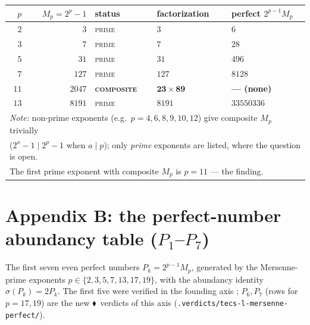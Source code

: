 \documentclass[11pt,a4paper]{article}
\newcommand{\tierF}{\textcolor{blue!60!black}{$\blacklozenge$}}   %
\newcommand{\sig}{\sigma}
\newcommand{\Mp}{M_p}
\theoremstyle{definition}
\begin{document}
\begin{center}
\begin{longtable}{rrlll}
\toprule
$p$ & $\Mp = 2^p-1$ & status & factorization & perfect $2^{p-1}\Mp$ \\
\midrule
\endhead
$2$  & $3$    & \textsc{prime} & $3$           & $6$ \\
$3$  & $7$    & \textsc{prime} & $7$           & $28$ \\
$5$  & $31$   & \textsc{prime} & $31$          & $496$ \\
$7$  & $127$  & \textsc{prime} & $127$         & $8128$ \\
$11$ & $2047$ & \textbf{\textsc{composite}} & $\mathbf{23\times 89}$ & \textbf{--- (none)} \\
$13$ & $8191$ & \textsc{prime} & $8191$        & $33550336$ \\
\midrule
\multicolumn{5}{l}{\emph{Note:} non-prime exponents (e.g.\ $p=4,6,8,9,10,12$) give
composite $\Mp$ trivially}\\
\multicolumn{5}{l}{($2^a-1\mid 2^p-1$ when $a\mid p$); only \emph{prime}
exponents are listed, where the question is open.}\\
\multicolumn{5}{l}{The first prime exponent with composite $\Mp$ is $p=11$ --- the
finding.}\\
\bottomrule
\end{longtable}
\end{center}

\section{Appendix B: the perfect-number abundancy table ($P_1$--$P_7$)}
\label{app:perfect-table}

The first seven even perfect numbers $P_k = 2^{p-1}\Mp$, generated by the
Mersenne-prime exponents $p \in \{2,3,5,7,13,17,19\}$, with the abundancy
identity $\sig(P_k) = 2 P_k$. The first five were verified in the founding axis
\citep{tecs-l-locus}; $P_6,P_7$ (rows for $p=17,19$) are the new \tierF\ verdicts
of this axis (\texttt{.verdicts/tecs-l-mersenne-perfect/}).
\end{document}
